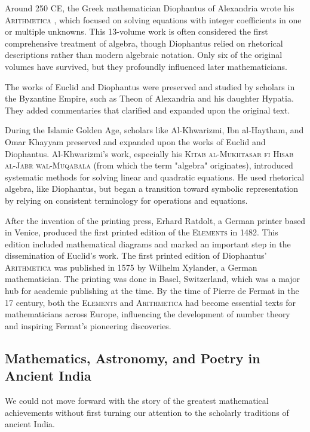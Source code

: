 Around 250 CE, the Greek mathematician Diophantus of Alexandria wrote his \textsc{Arithmetica} \cite{diophantus1910}, which focused on solving equations with integer coefficients in one or multiple unknowns. This 13-volume work is often considered the first comprehensive treatment of algebra, though Diophantus relied on rhetorical descriptions rather than modern algebraic notation. Only six of the original volumes have survived, but they profoundly influenced later mathematicians.

The works of Euclid and Diophantus were preserved and studied by scholars in the Byzantine Empire, such as Theon of Alexandria and his daughter Hypatia. They added commentaries that clarified and expanded upon the original text.

During the Islamic Golden Age, scholars like Al-Khwarizmi, Ibn al-Haytham, and Omar Khayyam preserved and expanded upon the works of Euclid and Diophantus. Al-Khwarizmi's work, especially his \textsc{Kitab al-Mukhtasar fi Hisab al-Jabr wal-Muqabala} (from which the term "algebra" originates), introduced systematic methods for solving linear and quadratic equations. He used rhetorical algebra, like Diophantus, but began a transition toward symbolic representation by relying on consistent terminology for operations and equations.

After the invention of the printing press, Erhard Ratdolt, a German printer based in Venice, produced the first printed edition of the \textsc{Elements} in 1482. This edition included mathematical diagrams and marked an important step in the dissemination of Euclid's work. The first printed edition of Diophantus' \textsc{Arithmetica} was published in 1575 by Wilhelm Xylander, a German mathematician. The printing was done in Basel, Switzerland, which was a major hub for academic publishing at the time. By the time of Pierre de Fermat in the 17\supth{} century, both the \textsc{Elements} and \textsc{Arithmetica} had become essential texts for mathematicians across Europe, influencing the development of number theory and inspiring Fermat’s pioneering discoveries.

\subsection{Mathematics, Astronomy, and Poetry in Ancient India}

We could not move forward with the story of the greatest mathematical achievements without first turning our attention to the scholarly traditions of ancient India.

